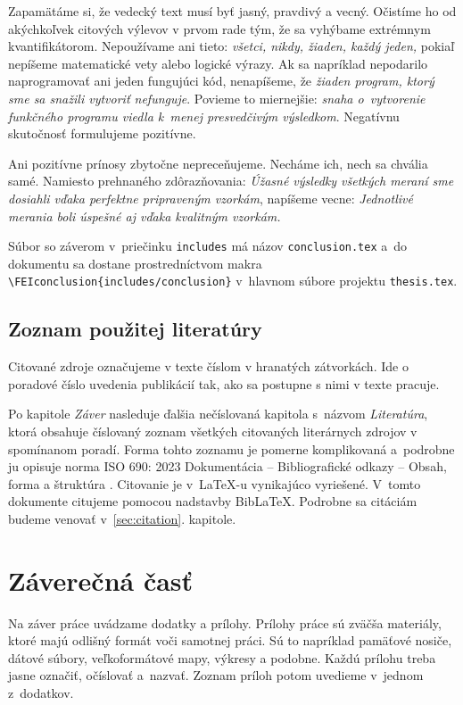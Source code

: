 Zapamätáme si, že vedecký text musí byť jasný, pravdivý a vecný.
Očistíme ho od akýchkoľvek citových výlevov v prvom rade tým,
že sa vyhýbame extrémnym kvantifikátorom. Nepoužívame ani tieto:
\emph{všetci, nikdy, žiaden, každý jeden,}
pokiaľ nepíšeme matematické vety alebo logické výrazy.
Ak sa napríklad nepodarilo naprogramovať ani jeden fungujúci kód,
nenapíšeme,
že \emph{žiaden program, ktorý sme sa snažili vytvoriť nefunguje}.
Povieme to miernejšie: \emph{snaha o~vytvorenie funkčného
programu viedla k~menej presvedčivým výsledkom}.
Negatívnu skutočnosť formulujeme pozitívne.

Ani pozitívne prínosy zbytočne nepreceňujeme.
Necháme ich, nech sa chvália samé.
Namiesto prehnaného zdôrazňovania:
\emph{Úžasné výsledky všetkých meraní sme dosiahli
vďaka perfektne pripraveným vzorkám},
napíšeme vecne:
\emph{Jednotlivé merania boli úspešné aj
vďaka kvalitným vzorkám.}

Súbor so záverom v~priečinku \verb|includes| má
názov \verb|conclusion.tex|
a~do dokumentu sa dostane prostredníctvom makra
\verb|\FEIconclusion{includes/conclusion}|
v~hlavnom súbore projektu \verb|thesis.tex|.

\subsection{Zoznam použitej literatúry}
Citované zdroje označujeme v texte číslom v hranatých zátvorkách. Ide o poradové číslo uvedenia publikácií tak, ako sa postupne s nimi v texte pracuje.

Po kapitole \emph{Záver} nasleduje ďalšia nečíslovaná kapitola
s~názvom \emph{Literatúra},
ktorá obsahuje číslovaný zoznam všetkých
citovaných literárnych zdrojov v spomínanom poradí.
Forma tohto zoznamu je pomerne komplikovaná a~podrobne
ju opisuje norma ISO 690: 2023 Dokumentácia -- Bibliografické odkazy -- Obsah, forma a štruktúra \cite{iso690}.
Citovanie je v~\LaTeX-u vynikajúco vyriešené.
V~tomto dokumente citujeme pomocou nadstavby Bib\LaTeX.
Podrobne sa citáciám budeme venovať v~\ref{sec:citation}. kapitole.

\section{Záverečná časť}
Na záver práce uvádzame dodatky a prílohy.
Prílohy práce sú zväčša materiály,
ktoré majú odlišný formát voči samotnej práci.
Sú to napríklad pamäťové nosiče,
dátové súbory, veľkoformátové mapy, výkresy a podobne.
Každú prílohu treba jasne označiť, očíslovať a~nazvať.
Zoznam príloh potom uvedieme v~jednom z~dodatkov.

